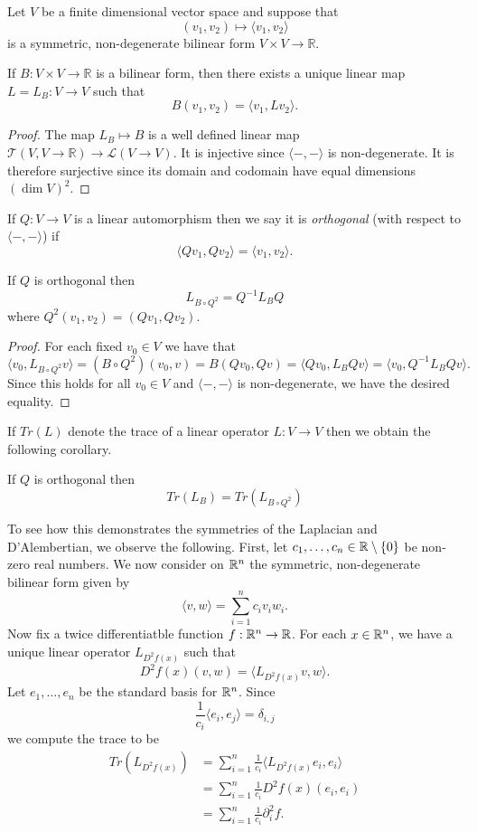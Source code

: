 \documentclass[twoside, a4paper, 10pt]{amsart}
\begin{document}
Let $V$ be a finite dimensional vector space and suppose that $$ (v_1, v_2) \mapsto \langle v_1, v_2 \rangle $$ is a symmetric, non-degenerate bilinear form $V \times V \to \mathbb{R}.$ 

\begin{lemma} If $B: V \times V \to \mathbb{R}$ is a bilinear form, then there exists a unique linear map $L=L_B: V \to V$ such that $$B(v_1,v_2) = \langle v_1, Lv_2 \rangle.$$  \end{lemma} 

\begin{proof} The map $L_B \mapsto B$ is a well defined linear map $\mathcal{T}(V,V \to \mathbb{R}) \to \mathcal{L}(V \to V)$. It is injective since $\langle -, - \rangle$ is non-degenerate. It is therefore surjective since its domain and codomain have equal dimensions $(\dim V)^2$. \end{proof}

If $Q:V \to V$ is a linear automorphism then we say it is \textit{orthogonal} (with respect to $\langle -, - \rangle$) if $$\langle Qv_1, Qv_2 \rangle = \langle v_1, v_2 \rangle .$$

\begin{lemma} If $Q$ is orthogonal then $$L_{B \circ Q^2} = Q^{-1} L_B Q$$ where $Q^2(v_1,v_2)=(Qv_1, Qv_2).$  \end{lemma}

\begin{proof} For each fixed $v_0 \in V$ we have that $$\langle v_0, L_{B \circ Q^2} v \rangle = (B \circ Q^2) (v_0, v) = B(Qv_0, Qv) = \langle Qv_0, L_B Qv \rangle = \langle v_0, Q^{-1} L_B Q v \rangle .$$  Since this holds for all $v_0 \in V$ and $\langle -, - \rangle $ is non-degenerate, we have the desired equality. \end{proof}

If $Tr(L)$ denote the trace of a linear operator $L:V \to V$ then we obtain the following corollary.

\begin{corol} If $Q$ is orthogonal then $$Tr(L_B) = Tr(L_{B \circ Q^2})$$ \end{corol}

To see how this demonstrates the symmetries of the Laplacian and D'Alembertian, we observe the following. First, let $c_1, \ldots, c_n \in \mathbb{R} \setminus \{0\}$ be non-zero real numbers. We now consider on $\mathbb{R}^n$ the symmetric, non-degenerate bilinear form given by $$\langle v, w \rangle = \sum_{i=1}^n c_i v_i w_i. $$ Now fix a twice differentiatble function $f:\mathbb{R}^n \to \mathbb{R}$. For each $x \in \mathbb{R}^n$, we have a unique linear operator $L_{D^2f(x)}$ such that $$D^2f(x) (v,w) = \langle L_{D^2f(x)}v, w \rangle.$$ Let $e_1, \ldots, e_n$ be the standard basis for $\mathbb{R}^n$. Since $$\frac{1}{c_i} \langle e_i, e_j \rangle = \delta_{i,j}$$ we compute the trace to be \begin{align*} Tr(L_{D^2f(x)}) &= \sum_{i=1}^n \frac{1}{c_i} \langle L_{D^2f(x)}e_i, e_i \rangle  \\ & = \sum_{i=1}^n \frac{1}{c_i} D^2f(x)(e_i,e_i) \\ & = \sum_{i=1}^n \frac{1}{c_i} \partial_i^2 f. \end{align*}
\end{document}
